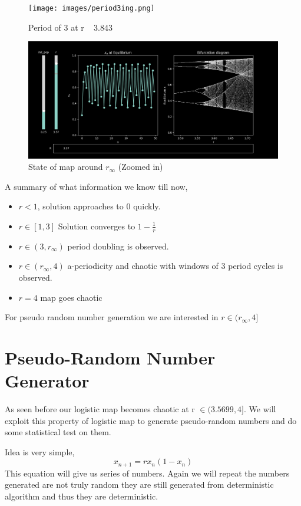 \documentclass{report}
\begin{document}
\begin{figure}[!h]
    \centering
    \texttt{[image: images/period3ing.png]}
    \caption{Period of 3 at r ~ 3.843}
    \label{fig:my_label6}
\end{figure}

\begin{figure}[!h]
    \centering
    \includegraphics[scale=.45]{images/rinfi.png}
    \caption{State of map around $r_{\infty}$ (Zoomed in)}
    \label{fig:my_label7}
\end{figure}

A summary of what information we know till now,

\begin{itemize}
  \item $r < 1$, solution approaches to 0 quickly.
  \item $r \in [1,3]$ Solution converges to $1-\frac{1}{r}$
  \item $r\in (3,r_{\infty})$ period doubling is observed.
  \item $r\in (r_{\infty},4)$ a-periodicity and chaotic with windows  of 3 period  cycles is observed.
  \item $r=4$ map goes chaotic
\end{itemize}
For pseudo random number generation we are interested in $r \in (r_{\infty},4]$
\newpage

\section{Pseudo-Random Number Generator}

As seen before our logistic map becomes chaotic at r $\in (3.5699,4]$. We will exploit this property of logistic map to generate pseudo-random numbers and do some statistical test on them.

Idea is very simple,
\begin{equation}
    x_{n+1} = rx_n(1-x_n) \nonumber
\end{equation}
This equation will give us series of numbers. Again we will repeat the numbers generated are not truly random they are still generated from deterministic algorithm and thus they are deterministic.
\end{document}
